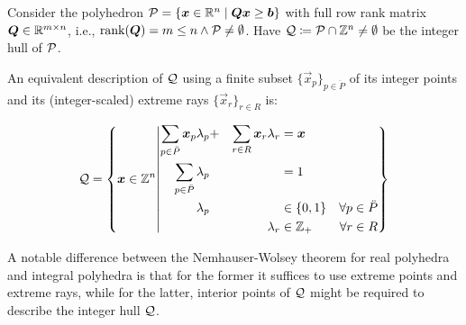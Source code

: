 \begin{theorem}\label{th:nemhauser-wolsey-integer}
Consider the polyhedron $\mathcal{P} = \{{\bm{x}} \in \mathbb{R}^n \mid {\bm{Q}} {\bm{x}} \geq {\bm{b}}\}$ with full row rank matrix ${\bm{Q}} \in \mathbb{R}^{m \times n}$, i.e., $\operatorname{rank}({\bm{Q}}) = m \leq n \land \mathcal{P} \neq \emptyset$. Have $\mathcal{Q} \coloneqq \mathcal{P} \cap \mathbb{Z}^n \neq \emptyset$ be the integer hull of $\mathcal{P}$.

An equivalent description of $\mathcal{Q}$ using a finite subset $\{\vec{x}_p\}_{p \in \ddot{P}}$ of its integer points and its (integer-scaled) extreme rays $\{\vec{x}_r\}_{r \in R}$ is:

\begin{equation}
\mathcal{Q} = \left\{ {\bm{x}} \in \mathbb{Z}^n \middle\vert
\begin{aligned}
\sum_{p \in \ddot{P}} {\bm{x}}_p \lambda_p &+ &\sum_{r \in R} {\bm{x}}_r \lambda_r &= {\bm{x}} &\\
\sum_{p \in \ddot{P}} \lambda_p & & &= 1 &\\
\lambda_p & & &\in \{0, 1\} &\forall p \in \ddot{P}\\
& &\lambda_r &\in \mathbb{Z}_+ &\forall r \in R
\end{aligned}
\right\}
\end{equation}
\end{theorem}

\begin{note}\label{note:nemhauser-wolsey}
A notable difference between the Nemhauser-Wolsey theorem for real polyhedra and integral polyhedra is that for the former it suffices to use extreme points and extreme rays, while for the latter, interior points of $\mathcal{Q}$ might be required to describe the integer hull $\mathcal{Q}$.
\end{note}
